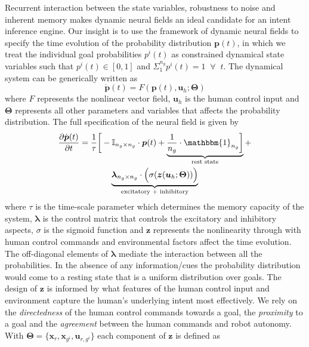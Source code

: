 Recurrent interaction between the state variables, robustness to noise and inherent memory makes dynamic neural fields an ideal candidate for an intent inference engine. Our insight is to use the framework of dynamic neural fields to specify the time evolution of the probability distribution $\boldsymbol{p}(t)$, in which we treat the individual goal probabilities $p^i(t)$ as constrained dynamical state variables such that $p^i(t) \in [0, 1]$ and $\Sigma_{1}^{n_g}p^{i}(t) = 1 \;\;\forall\;\; t$. The dynamical system can be generically written as 
\begin{equation}
\dot{\boldsymbol{p}}(t) = F(\boldsymbol{p}(t), \boldsymbol{u}_h ; \boldsymbol{\Theta})
\end{equation}
where $F$ represents the nonlinear vector field, $\boldsymbol{u}_h$ is the human control input and $\boldsymbol{\Theta}$ represents all other parameters and variables that affects the probability distribution. 
The full specification of the neural field is given by
\begin{multline}\label{eq:dft}
\frac{\partial \dot{\boldsymbol{p}}(t)}{\partial t} = \frac{1}{\tau}\bigg[-\mathbb{I}_{n_g\times n_g}\cdot\boldsymbol{p}(t) + \underbrace{\frac{1}{n_g}\cdot\mathbbm{1}_{n_g}\bigg]}_{\text{rest state}} + \\ \underbrace{\boldsymbol{\lambda}_{n_g\times n_g}\cdot\Big(\sigma(\boldsymbol{z}(\boldsymbol{u}_h;\boldsymbol{\Theta}))\Big)}_{\text{excitatory + inhibitory}}
\end{multline}
where $\tau$ is the time-scale parameter which determines the memory capacity of the system, $\boldsymbol{\lambda}$ is the control matrix that controls the excitatory and inhibitory aspects, $\sigma$ is the sigmoid function and $\boldsymbol{z}$ represents the nonlinearity through with human control commands and environmental factors affect the time evolution. 
The off-diagonal elements of $\boldsymbol{\lambda}$ mediate the interaction between all the probabilities. In the absence of any information/cues the probability distribution would come to a resting state that is a uniform distribution over goals. The design of $\boldsymbol{z}$ is informed by what features of the human control input and environment capture the human's underlying intent most effectively. We rely on the \textit{directedness} of the human control commands towards a goal, the \textit{proximity} to a goal and the \textit{agreement} between the human commands and robot autonomy. 
With $\boldsymbol{\Theta} = \{\boldsymbol{x}_r, \boldsymbol{x}_{g^i}, \boldsymbol{u}_{r, g^i}\}$ each component of $\boldsymbol{z}$ is defined as 

